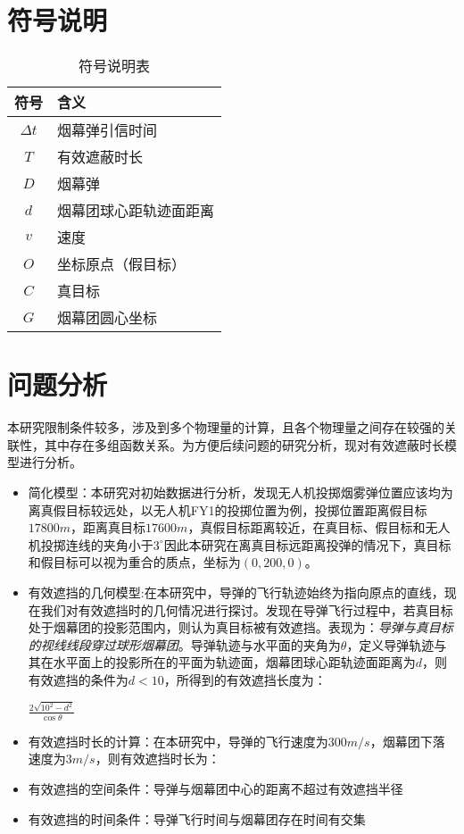 \documentclass{article}
\begin{document}
\section{符号说明}

\begin{table}[H]
\centering
\caption{符号说明表}
\begin{tabular}{|c|l|}
\hline
符号 & 含义 \\
\hline
$\Delta t$ & 烟幕弹引信时间 \\
$T$ & 有效遮蔽时长 \\
$D$ & 烟幕弹 \\
$d$ & 烟幕团球心距轨迹面距离 \\
$v$ & 速度 \\
$O$ & 坐标原点（假目标） \\
$C$ & 真目标 \\
$G$ & 烟幕团圆心坐标 \\
\hline
\end{tabular}
\end{table}

\section{问题分析}
本研究限制条件较多，涉及到多个物理量的计算，且各个物理量之间存在较强的关联性，其中存在多组函数关系。为方便后续问题的研究分析，现对有效遮蔽时长模型进行分析。

\begin{itemize}
    \item 简化模型：本研究对初始数据进行分析，发现无人机投掷烟雾弹位置应该均为离真假目标较远处，以无人机FY1的投掷位置为例，投掷位置距离假目标$17800m$，距离真目标$17600m$，真假目标距离较近，在真目标、假目标和无人机投掷连线的夹角小于$3^\circ$因此本研究在离真目标远距离投弹的情况下，真目标和假目标可以视为重合的质点，坐标为$(0,200,0)$。
    \item 有效遮挡的几何模型:在本研究中，导弹的飞行轨迹始终为指向原点的直线，现在我们对有效遮挡时的几何情况进行探讨。发现在导弹飞行过程中，若真目标处于烟幕团的投影范围内，则认为真目标被有效遮挡。表现为：\textit{导弹与真目标的视线线段穿过球形烟幕团}。导弹轨迹与水平面的夹角为$\theta$，定义导弹轨迹与其在水平面上的投影所在的平面为轨迹面，烟幕团球心距轨迹面距离为$d$，则有效遮挡的条件为$d<10$，所得到的有效遮挡长度为：
    \begin{center}
        $\displaystyle \frac{2\sqrt{10^2-d^2}}{\cos\theta}$
    \end{center}
    \item 有效遮挡时长的计算：在本研究中，导弹的飞行速度为$300m/s$，烟幕团下落速度为$3m/s$，则有效遮挡时长为：
    \item 有效遮挡的空间条件：导弹与烟幕团中心的距离不超过有效遮挡半径
    \item 有效遮挡的时间条件：导弹飞行时间与烟幕团存在时间有交集
\end{itemize}
\end{document}
